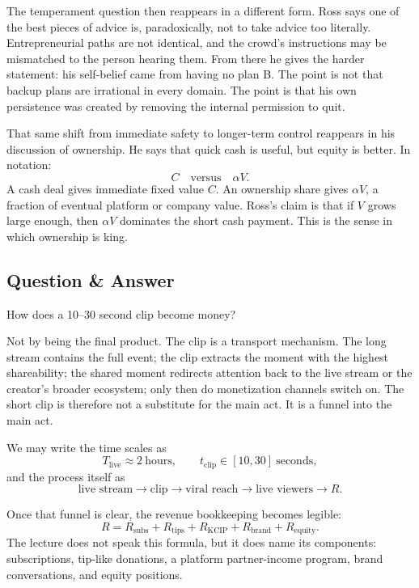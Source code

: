 The temperament question then reappears in a different form. Ross says one of the best pieces of advice is, paradoxically, not to take advice too literally. Entrepreneurial paths are not identical, and the crowd's instructions may be mismatched to the person hearing them. From there he gives the harder statement: his self-belief came from having no plan B. The point is not that backup plans are irrational in every domain. The point is that his own persistence was created by removing the internal permission to quit.

That same shift from immediate safety to longer-term control reappears in his discussion of ownership. He says that quick cash is useful, but equity is better. In notation:
\begin{equation}
C \quad \text{versus} \quad \alpha V.
\end{equation}
A cash deal gives immediate fixed value \(C\). An ownership share gives \(\alpha V\), a fraction of eventual platform or company value. Ross's claim is that if \(V\) grows large enough, then \(\alpha V\) dominates the short cash payment. This is the sense in which ownership is king.

\subsection{Question \& Answer}

How does a 10--30 second clip become money?

Not by being the final product. The clip is a transport mechanism. The long stream contains the full event; the clip extracts the moment with the highest shareability; the shared moment redirects attention back to the live stream or the creator's broader ecosystem; only then do monetization channels switch on. The short clip is therefore not a substitute for the main act. It is a funnel into the main act.

We may write the time scales as
\begin{equation}
T_{\text{live}} \approx 2\ \text{hours},\qquad t_{\text{clip}} \in [10,30]\ \text{seconds},
\end{equation}
and the process itself as
\begin{equation}
\text{live stream} \to \text{clip} \to \text{viral reach} \to \text{live viewers} \to R.
\end{equation}

Once that funnel is clear, the revenue bookkeeping becomes legible:
\begin{equation}
R = R_{\text{subs}} + R_{\text{tips}} + R_{\text{KCIP}} + R_{\text{brand}} + R_{\text{equity}}.
\end{equation}
The lecture does not speak this formula, but it does name its components: subscriptions, tip-like donations, a platform partner-income program, brand conversations, and equity positions.

